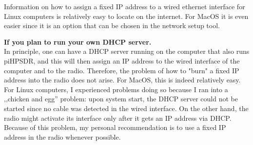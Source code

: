 \documentclass[12pt]{book}
\def\pH{pi\-HPSDR\xspace}
\begin{document}
Information on how to assign a fixed IP address to a wired ethernet interface for Linux computers
is relatively easy to locate on the internet. For MacOS it is even easier since it is an option that
can be chosen in the network setup tool.

\textbf{If you plan to run your own DHCP server.}\\
In principle, one can have a DHCP server running on the computer that also runs \pH, and this
will then assign an IP address to the wired interface of the computer and to the
radio. Therefore, the problem of how to "burn" a fixed IP address into the radio does not arise. For MacOS, this
is indeed relatively easy. For Linux computers, I experienced problems doing so because I ran into a
,,chicken and egg'' problem: upon system start, the DHCP server could not be started since no cable was
detected in the wired interface. On the other hand, the radio might activate its interface only after
it gets an IP address via DHCP. Because of this problem, my personal recommendation is to use a fixed
IP address in the radio whenever possible.



\begin{center}
\fbox{
\parbox{\textwidth - 4cm}{
\begin{center}
\textbf{\color{red} ----- End of the \pH manual -----}
\end{center}
}
}
\end{center}
\end{document}
